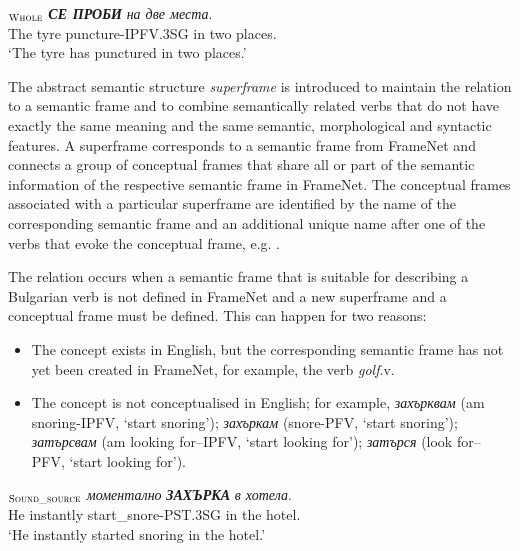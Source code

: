 \documentclass[output=paper,colorlinks,citecolor=brown]{langscibook}
\begin{document}
\begin{exe}
 \ex  \label{ch01:ex:19}
$_{\text{\textsc{Whole}}}$   \textit{\textbf{СЕ ПРОБИ}}  \textit{на две места}.\\
{The tyre}  puncture-IPFV.3SG {in two places}. \\
\glt `{The tyre has punctured in two places}.'
\end{exe}


The abstract semantic structure \emph{superframe} is introduced to maintain the relation to a semantic frame and to combine semantically related verbs that do not have exactly the same meaning and the same semantic, morphological and syntactic features. A superframe corresponds to a semantic frame from FrameNet and connects a group of conceptual frames that share all or part of the semantic information of the respective semantic frame in FrameNet. The conceptual frames associated with a particular superframe are identified by the name of the corresponding semantic frame and an additional unique name after one of the verbs that evoke the conceptual frame, e.g. .

The relation  occurs when a semantic frame that is suitable for describing a Bulgarian verb is not defined in FrameNet and a new superframe and a conceptual frame must be defined. This can happen for two reasons:

\begin{itemize}
    \item The concept exists in English, but the corresponding semantic frame has not yet been created in FrameNet, for example, the verb \textit{golf}.v.
    \item  The concept is not conceptualised in English; for example, \textit{захърквам} (am snoring-IPFV, `start snoring'); \textit{захъркам} (snore-PFV, `start snoring');  \textit{за\-търсвам} (am looking for--IPFV, `start looking for');  \textit{затърся} (look for--PFV, `start looking for').
\end{itemize}

\begin{exe}
 \ex  \label{ch01:ex:20}
 $_{\text{\textsc{Sound\_source}}}$  \textit{моментално}  \textit{\textbf{ЗАХЪРКА}}   \textit{в хотела}.\\
{He}  {instantly} start\_snore-PST.3SG {in the hotel}. \\
\glt `{He instantly started snoring in the hotel}.'
 \end{exe}
\end{document}
